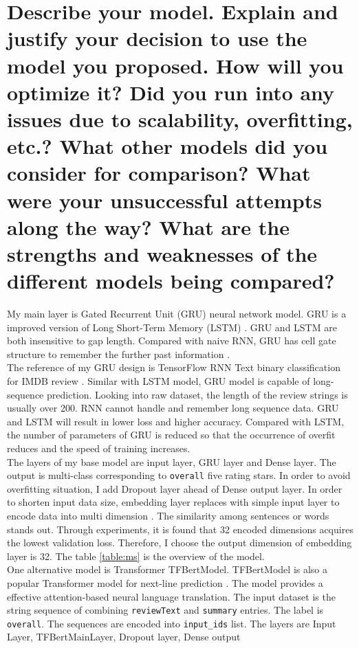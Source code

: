 \documentclass[12pt]{article}
\begin{document}
\section{Describe your model. Explain and justify your decision to use the model you proposed. How
will you optimize it? Did you run into any issues due to scalability, overfitting, etc.? What
other models did you consider for comparison? What were your unsuccessful attempts along
the way? What are the strengths and weaknesses of the different models being compared?} 
My main layer is Gated Recurrent Unit (GRU) neural network model.
GRU is a improved version of Long Short-Term Memory (LSTM) \cite{gru}. GRU and LSTM are both insensitive 
to gap length. Compared with naive RNN, GRU has cell gate structure to remember the further past information \cite{lstm}.\\
The reference of my GRU design is
TensorFlow RNN Text binary classification for IMDB review \cite{Textclassification}. Similar with LSTM model, GRU
model is capable of long-sequence prediction. Looking into raw dataset, the length of the review strings
is usually over 200. RNN cannot handle and remember long sequence data. GRU and LSTM will result in lower loss and 
higher accuracy.
Compared with LSTM, the number of parameters of GRU is reduced so
that the occurrence of overfit reduces and the speed of training increases.\\
The layers of my base model are input layer, GRU layer and Dense layer. The output is multi-class corresponding to \texttt{overall} five rating stars. In order to avoid overfitting situation, I add Dropout layer ahead of Dense output layer. In order to shorten input data size, embedding layer replaces with simple input layer to encode data into
multi dimension \cite{emd}. The similarity among sentences or words stands out. Through experiments,
it is found that 32 encoded dimensions acquires the lowest validation loss. Therefore, I choose the output
dimension of embedding layer is 32. The table \ref{table:ms} is the overview of the model.\\
One alternative model is Transformer TFBertModel.
TFBertModel is also a popular Transformer model for next-line prediction \cite{BERT, trans}. 
The model provides a effective attention-based neural language translation.
The input dataset is the string
sequence of combining \texttt{reviewText} and \texttt{summary} entries. The label is \texttt{overall}. The sequences are
encoded into \texttt{input\_ids} list. The layers are Input Layer, TFBertMainLayer, Dropout layer, Dense output
\end{document}
